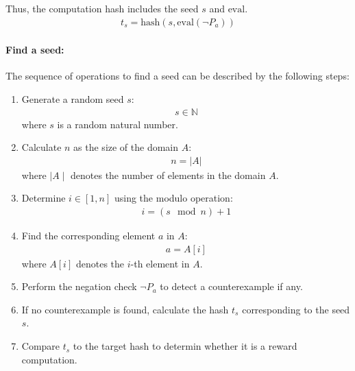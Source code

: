 \documentclass[runningheads]{llncs}
\begin{document}
Thus, the computation hash includes the seed  \( s \) and \(\text{eval}\). 
\begin{align}
t_s = \text{hash}(s, \text{eval}(\neg P_{a}))
\end{align}
\paragraph{Find a seed:}
The sequence of operations to find a seed can be described by the following steps:
\begin{enumerate}
\item Generate a random seed $s$: 
\begin{align}
s \in \mathbb{N} 
\end{align}
where $s$ is a random natural number.
\item Calculate $n$ as the size of the domain $A$: 
\begin{align}
n = |A|
\end{align}
where $\mid A \mid$ denotes the number of elements in the domain $A$.
\item Determine $i \in [1, n]$ using the modulo operation:
\begin{align}
i = (s \mod n) + 1
\end{align}
\item Find the corresponding element $a$ in $A$:
\begin{align}
a=A[i]
\end{align}
where $A[i]$ denotes the $i$-th element in $A$.
\item Perform the negation check $\neg P_{a}$ to detect a counterexample if any.

\item If no counterexample is found, calculate the hash \( t_s \) corresponding to the seed \( s \).
\item Compare \( t_s \) to the target hash to determin whether it is a reward computation.
\end{enumerate}
\end{document}
